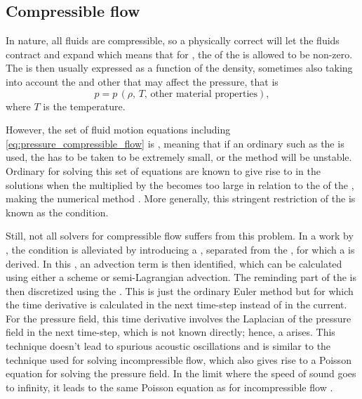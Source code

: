 \subsection{Compressible flow}

In nature, all fluids are compressible, so a physically correct  will let the fluids contract and expand which means that for , the \divergence of the  is allowed to be non-zero. The \pressure is then usually expressed as a function of the density, sometimes also taking into account the \temperature and other \properties that may affect the pressure, that is
%
\begin{equation} \label{eq:pressure_compressible_flow}
p = p\,(\rho,\,T,\,\text{other material properties}),
\end{equation}
%
where $T$ is the temperature.

However, the set of fluid motion equations including \eqref{eq:pressure_compressible_flow} is , meaning that if an ordinary  such as the  is used, the \timestep has to be taken to be extremely small, or the method will be unstable. Ordinary  for solving this set of equations are known to give rise to  in the solutions when the  multiplied by the  becomes too large in relation to the  of the \cells, making the numerical method \unstable. More generally, this stringent restriction of the \timestep is known as the \CFL condition.

Still, not all solvers for compressible flow suffers from this problem. In a work by \citet{Kwatra2009}, the \CFL condition is alleviated by introducing a , separated from the , for which a \PDE is derived. In this \PDE, an advection term is then identified, which can be calculated using either a \HO \ENO scheme or semi-Lagrangian advection. The reminding part of the \PDE is then discretized using the . This is just the ordinary Euler method but for which the time derivative is calculated in the next time-step instead of in the current. For the pressure field, this time derivative involves the Laplacian of the pressure field in the next time-step, which is not known directly; hence, a  arises. This technique doesn't lead to spurious acoustic oscillations and is similar to the technique used for solving incompressible flow, which also gives rise to a Poisson equation for solving the pressure field. In the limit where the speed of sound goes to infinity, it leads to the same Poisson equation as for incompressible flow \citep{Kwatra2009}.

